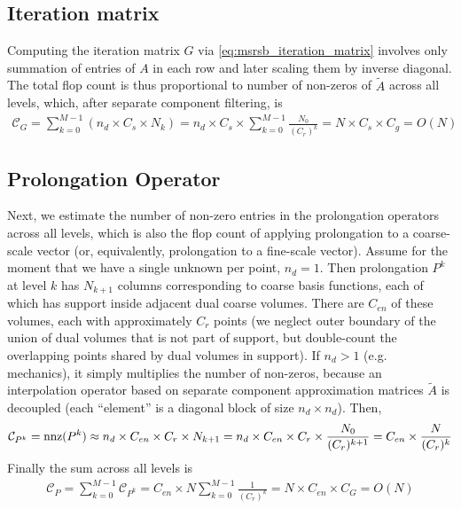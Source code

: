 \subsection{Iteration matrix}

Computing the iteration matrix $G$ via \cref{eq:msrsb_iteration_matrix} involves only summation of entries of $A$ in each row and later scaling them by inverse diagonal.   The total flop count is thus proportional to number of non-zeros of $\widetilde{A}$ across all levels, which, after separate component filtering, is
\begin{align}
    \mathcal{C}_G = \sum\limits_{k=0}^{M-1} (n_d \times C_s \times N_k) = n_d \times C_s \times \sum\limits_{k=0}^{M-1} \frac{N_0}{(C_r)^k} = N \times C_s \times C_g = O(N) \label{eq:complexity_iter_mat}
\end{align}

\subsection{Prolongation Operator}

Next, we estimate the number of non-zero entries in the prolongation operators across all levels, which is also the flop count of applying prolongation to a coarse-scale vector (or, equivalently, prolongation to a fine-scale vector).   Assume for the moment that we have a single unknown per point, $n_d = 1$.   Then prolongation $P^k$ at level $k$ has $N_{k+1}$ columns corresponding to coarse basis functions, each of which has support inside adjacent dual coarse volumes.   There are $C_{en}$ of these volumes, each with approximately $C_r$ points (we neglect outer boundary of the union of dual volumes that is not part of support, but double-count the overlapping points shared by dual volumes in support).   If $n_d > 1$ (e.g. mechanics), it simply multiplies the number of non-zeros, because an interpolation operator based on separate component approximation matrices $\widetilde{A}$ is decoupled (each ``element'' is a diagonal block of size $n_d \times n_d$).   Then,
\begin{align}
    \mathcal{C}_{P^k} = \operatorname{nnz}(P^k) \approx n_d \times C_{en} \times C_r \times N_{k+1} = n_d \times C_{en} \times C_r \times \frac{N_0}{(C_r)^{k+1}} = C_{en} \times \frac{N}{(C_r)^k} \label{eq:complexity_prolongation}
\end{align}
Finally the sum across all levels is
\begin{align}
    \mathcal{C}_{P} = \sum\limits_{k=0}^{M-1} \mathcal{C}_{P^k} = C_{en} \times N \sum\limits_{k=0}^{M-1}\frac{1}{(C_r)^k} = N \times C_{en} \times C_G = O(N) \label{eq:complexity_prolongation_all}
\end{align}

